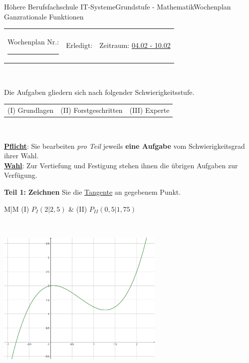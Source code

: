 \documentclass[oneside,openany,headings=optiontotoc,11pt,numbers=noenddot]{scrreprt}
\begin{document}
	\begin{worksheet}{Höhere Berufsfachschule IT-Systeme}{Grundstufe - Mathematik}{Wochenplan Ganzrationale Funktionen}
		\noindent
		\begin{tabularx}{\textwidth}{XXl}
			Wochenplan Nr.: \rule{0.15\textwidth}{1pt} & Erledigt: & Zeitraum: \underline{04.02 - 10.02}
		\end{tabularx}\\
		\par\noindent
		Die Aufgaben gliedern sich nach folgender Schwierigkeitsstufe.\\
		\begin{tabularx}{\textwidth}{XXX}
			(I) Grundlagen & (II) Forstgeschritten & (III) Experte
		\end{tabularx}\\
		\par\noindent
		\textbf{\underline{Pflicht}}: Sie bearbeiten \textit{pro Teil} jeweils \textbf{eine Aufgabe} vom Schwierigkeitsgrad ihrer Wahl.\\
		\underline{\textbf{Wahl}}: Zur Vertiefung und Festigung stehen ihnen die übrigen Aufgaben zur Verfügung.
		\begin{framed}
			\noindent
			\textbf{Teil 1:} \textbf{Zeichnen} Sie die \underline{Tangente} an gegebenem Punkt.\\
			\par\noindent
			\renewcommand{\arraystretch}{1.5}
			\begin{tabularx}{\textwidth}{M|M}
				(I) \(P_I(2|2,5)\) & (II) \(P_{II}(0,5|1,75)\)\\
				\hline
			\end{tabularx}\\
			\renewcommand{\arraystretch}{1}
			\begin{center}
				\includegraphics[width=0.6\textwidth]{../99_Bilder/WP/WP13_T1.jpg}
			\end{center}

\end{framed}
\end{worksheet}
\end{document}
